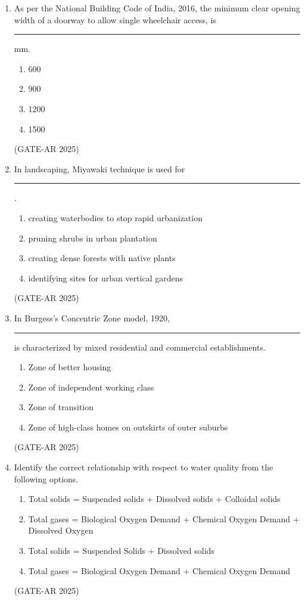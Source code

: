 \documentclass[a4paper,10pt]{article}
\begin{document}
\begin{enumerate}
    \item As per the National Building Code of India, 2016, the minimum clear opening width of a doorway to allow single wheelchair access, is \rule{2cm}{0.4pt} mm.
    \begin{multicols}{4}
    \begin{enumerate}
        \item 600
        \item 900
        \item 1200
        \item 1500
    \end{enumerate}
    \end{multicols}
    \hfill (GATE-AR 2025)

    \item In landscaping, Miyawaki technique is used for \rule{2cm}{0.4pt}.
    \begin{enumerate}
        \item creating waterbodies to stop rapid urbanization
        \item pruning shrubs in urban plantation
        \item creating dense forests with native plants
        \item identifying sites for urban vertical gardens
    \end{enumerate}
    \hfill (GATE-AR 2025)

    \item In Burgess's Concentric Zone model, 1920, \rule{2cm}{0.4pt} is characterized by mixed residential and commercial establishments.
    \begin{enumerate}
        \item Zone of better housing
        \item Zone of independent working class
        \item Zone of transition
        \item Zone of high-class homes on outskirts of outer suburbs
    \end{enumerate}
    \hfill (GATE-AR 2025)

    \item Identify the correct relationship with respect to water quality from the following options.
    \begin{enumerate}
        \item Total solids = Suspended solids + Dissolved solids + Colloidal solids
        \item Total gases = Biological Oxygen Demand + Chemical Oxygen Demand + Dissolved Oxygen
        \item Total solids = Suspended Solids + Dissolved solids
        \item Total gases = Biological Oxygen Demand + Chemical Oxygen Demand
    \end{enumerate}
    \hfill (GATE-AR 2025)


\end{enumerate}
\end{document}
